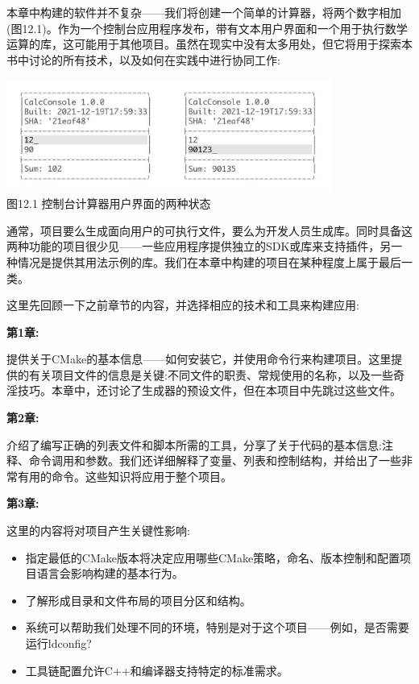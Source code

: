 

本章中构建的软件并不复杂——我们将创建一个简单的计算器，将两个数字相加(图12.1)。作为一个控制台应用程序发布，带有文本用户界面和一个用于执行数学运算的库，这可能用于其他项目。虽然在现实中没有太多用处，但它将用于探索本书中讨论的所有技术，以及如何在实践中进行协同工作:

\begin{center}
\includegraphics[width=0.8\textwidth]{content/3/chapter12/images/1.jpg}\\
图12.1 控制台计算器用户界面的两种状态
\end{center}

通常，项目要么生成面向用户的可执行文件，要么为开发人员生成库。同时具备这两种功能的项目很少见——一些应用程序提供独立的SDK或库来支持插件，另一种情况是提供其用法示例的库。我们在本章中构建的项目在某种程度上属于最后一类。

这里先回顾一下之前章节的内容，并选择相应的技术和工具来构建应用:

\textbf{第1章:}

提供关于CMake的基本信息——如何安装它，并使用命令行来构建项目。这里提供的有关项目文件的信息是关键:不同文件的职责、常规使用的名称，以及一些奇淫技巧。本章中，还讨论了生成器的预设文件，但在本项目中先跳过这些文件。

\textbf{第2章:}

介绍了编写正确的列表文件和脚本所需的工具，分享了关于代码的基本信息:注释、命令调用和参数。我们还详细解释了变量、列表和控制结构，并给出了一些非常有用的命令。这些知识将应用于整个项目。

\textbf{第3章:}

这里的内容将对项目产生关键性影响:

\begin{itemize}
\item 
指定最低的CMake版本将决定应用哪些CMake策略，命名、版本控制和配置项目语言会影响构建的基本行为。

\item 
了解形成目录和文件布局的项目分区和结构。

\item 
系统可以帮助我们处理不同的环境，特别是对于这个项目——例如，是否需要运行ldconfig?

\item 
工具链配置允许C++和编译器支持特定的标准需求。
\end{itemize}

